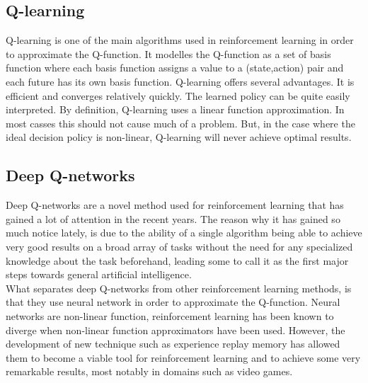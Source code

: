  
\subsection{Q-learning}
Q-learning is one of the main algorithms used in reinforcement learning in order to approximate the Q-function. It modelles the Q-function as a set of basis function where each basis function assigns a value to a (state,action) pair and each future has its own basis function. Q-learning offers several advantages. It is efficient and converges relatively quickly. The learned policy can be quite easily interpreted. By definition, Q-learning uses a linear function approximation. In most casses this should not cause much of a problem. But, in the case where the ideal decision policy is non-linear, Q-learning will never achieve optimal results.
\subsection{Deep Q-networks}

Deep Q-networks are a novel method used for reinforcement learning that has gained a lot of attention in the recent years. The reason why it has gained so much notice lately, is due to the ability of a single algorithm being able to achieve very good results on a broad array of tasks without the need for any specialized knowledge about the task beforehand, leading some to call it as the first major steps towards general artificial intelligence.\\
What separates deep Q-networks from other reinforcement learning methods, is that they use neural network in order to approximate the Q-function. Neural networks are non-linear function, reinforcement learning has been known to diverge when non-linear function approximators have been used. However, the development of new technique such as experience replay memory has allowed them to become a viable tool for reinforcement learning and to achieve some very remarkable results, most notably in domains such as video games.


































